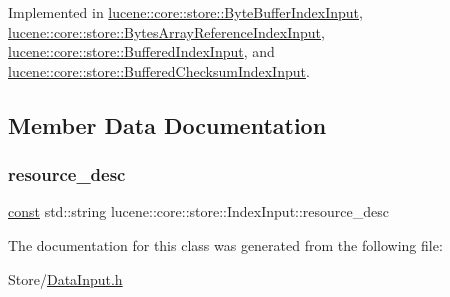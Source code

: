 Implemented in \mbox{\hyperlink{classlucene_1_1core_1_1store_1_1ByteBufferIndexInput_acadb7814d29b518a2b165aa29184a9ab}{lucene\+::core\+::store\+::\+Byte\+Buffer\+Index\+Input}}, \mbox{\hyperlink{classlucene_1_1core_1_1store_1_1BytesArrayReferenceIndexInput_a6519e4407cfb07a21032fe2252870d5f}{lucene\+::core\+::store\+::\+Bytes\+Array\+Reference\+Index\+Input}}, \mbox{\hyperlink{classlucene_1_1core_1_1store_1_1BufferedIndexInput_a0fd5c90945647f8f9b306c1a318a83fc}{lucene\+::core\+::store\+::\+Buffered\+Index\+Input}}, and \mbox{\hyperlink{classlucene_1_1core_1_1store_1_1BufferedChecksumIndexInput_a3dbbd2618e6ab6dfeee220ae5b6b8cda}{lucene\+::core\+::store\+::\+Buffered\+Checksum\+Index\+Input}}.



\subsection{Member Data Documentation}
\mbox{\label{classlucene_1_1core_1_1store_1_1IndexInput_a5425147277f9cf9c08ba50e411c45473}} 
\subsubsection{\texorpdfstring{resource\+\_\+desc}{resource\_desc}}
{\footnotesize\ttfamily \mbox{\hyperlink{ZlibCrc32_8h_a2c212835823e3c54a8ab6d95c652660e}{const}} std\+::string lucene\+::core\+::store\+::\+Index\+Input\+::resource\+\_\+desc\hspace{0.3cm}{\ttfamily [protected]}}



The documentation for this class was generated from the following file\+:\begin{DoxyCompactItemize}
\item 
Store/\mbox{\hyperlink{DataInput_8h}{Data\+Input.\+h}}\end{DoxyCompactItemize}
